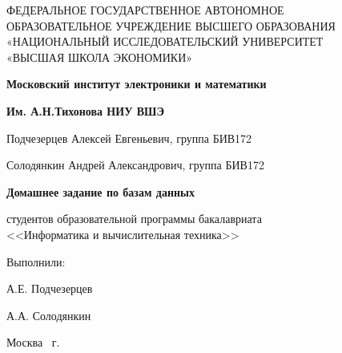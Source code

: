 \begin{titlepage}
	\begin{center}
		ФЕДЕРАЛЬНОЕ  ГОСУДАРСТВЕННОЕ АВТОНОМНОЕ \\
		ОБРАЗОВАТЕЛЬНОЕ УЧРЕЖДЕНИЕ ВЫСШЕГО ОБРАЗОВАНИЯ\\
		«НАЦИОНАЛЬНЫЙ ИССЛЕДОВАТЕЛЬСКИЙ УНИВЕРСИТЕТ\\
		«ВЫСШАЯ ШКОЛА ЭКОНОМИКИ»
	\end{center}
	
	\begin{center}
		\textbf{Московский институт электроники и математики}
		
		\textbf{Им. А.Н.Тихонова НИУ ВШЭ}
	\end{center}
	\vspace{1ex}	
	\begin{center}
		Подчезерцев Алексей Евгеньевич, группа БИВ172
		
		Солодянкин Андрей Александрович, группа БИВ172
	\end{center}	
	\vspace{1ex}
	\begin{center}
		\textbf{Домашнее задание по базам данных}
	\end{center}	
	\vspace{2ex}
	\begin{center}
		студентов образовательной программы бакалавриата \\
		<<Информатика и вычислительная техника>> \\
		
	\end{center}
	\vspace{2ex}
	\begin{flushright}
		Выполнили: 
		
		\vspace{1ex}
		А.Е. Подчезерцев 
		
		\vspace{1ex}
		А.А. Солодянкин 
	\end{flushright}

	\vfill
	\begin{center}
		Москва \the\year \, г.
	\end{center}
\end{titlepage}